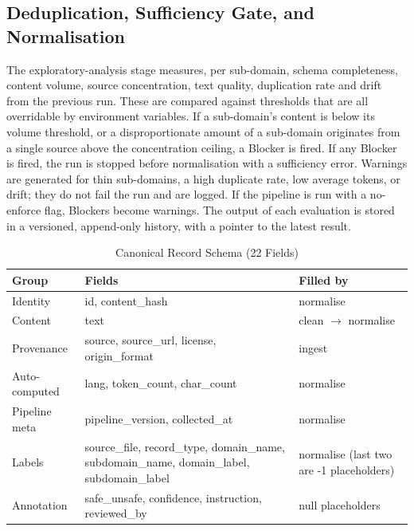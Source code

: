 \documentclass[conference]{IEEEtran}
\begin{document}
\subsection{Deduplication, Sufficiency Gate, and Normalisation}

The exploratory-analysis stage measures, per sub-domain, schema completeness, content volume, source concentration, text quality, duplication rate and drift from the previous run. These are compared against thresholds that are all overridable by environment variables. If a sub-domain's content is below its volume threshold, or a disproportionate amount of a sub-domain originates from a single source above the concentration ceiling, a Blocker is fired. If any Blocker is fired, the run is stopped before normalisation with a sufficiency error. Warnings are generated for thin sub-domains, a high duplicate rate, low average tokens, or drift; they do not fail the run and are logged. If the pipeline is run with a no-enforce flag, Blockers become warnings. The output of each evaluation is stored in a versioned, append-only history, with a pointer to the latest result.


\begin{table}[t]
\caption{Canonical Record Schema (22 Fields)}
\label{tab:schema}
\centering
\renewcommand{\arraystretch}{1.2}
\begin{tabular}{|p{1.5cm}|p{1.5cm}|p{3.6cm}|}
\hline
Group & Fields & Filled by \\ \hline
Identity & id, content\_hash & normalise \\ \hline
Content & text & clean $\rightarrow$ normalise \\ \hline
Provenance & source, source\_url, license, origin\_format & ingest \\ \hline
Auto-computed & lang, token\_count, char\_count & normalise \\ \hline
Pipeline meta & pipeline\_version, collected\_at & normalise \\ \hline
Labels & source\_file, record\_type, domain\_name, subdomain\_name, domain\_label, subdomain\_label & normalise (last two are -1 placeholders) \\ \hline
Annotation & safe\_unsafe, confidence, instruction, reviewed\_by & null placeholders \\ \hline
\end{tabular}
\end{table}
\end{document}
